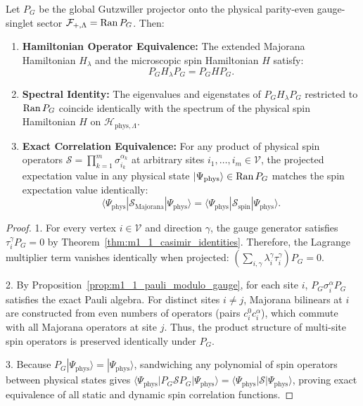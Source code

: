 \begin{theorem}
\label{thm:m1_1_projected_equivalence}
Let $P_G$ be the global Gutzwiller projector onto the physical parity-even gauge-singlet sector $\mathcal{F}_{+, \Lambda} = \operatorname{Ran} P_G$. Then:
\begin{enumerate}
    \item \textbf{Hamiltonian Operator Equivalence:} The extended Majorana Hamiltonian $H_\lambda$ and the microscopic spin Hamiltonian $H$ satisfy:
    \begin{equation}
    \label{eq:m1_1_projected_equivalence}
    P_G H_\lambda P_G = P_G H P_G.
    \end{equation}
    \item \textbf{Spectral Identity:} The eigenvalues and eigenstates of $P_G H_\lambda P_G$ restricted to $\operatorname{Ran} P_G$ coincide identically with the spectrum of the physical spin Hamiltonian $H$ on $\mathcal{H}_{\mathrm{phys}, \Lambda}$.
    \item \textbf{Exact Correlation Equivalence:} For any product of physical spin operators $\mathcal{S} = \prod_{k=1}^m \sigma_{i_k}^{\alpha_k}$ at arbitrary sites $i_1, \dots, i_m \in \mathcal{V}$, the projected expectation value in any physical state $|\Psi_{\mathrm{phys}}\rangle \in \operatorname{Ran} P_G$ matches the spin expectation value identically:
    \begin{equation}
    \label{eq:m1_1_projected_correlations}
    \langle \Psi_{\mathrm{phys}} | \mathcal{S}_{\mathrm{Majorana}} | \Psi_{\mathrm{phys}} \rangle = \langle \Psi_{\mathrm{phys}} | \mathcal{S}_{\mathrm{spin}} | \Psi_{\mathrm{phys}} \rangle.
    \end{equation}
\end{enumerate}
\end{theorem}
\begin{proof}
1. For every vertex $i \in \mathcal{V}$ and direction $\gamma$, the gauge generator satisfies $\tau_i^\gamma P_G = 0$ by Theorem~\ref{thm:m1_1_casimir_identities}. Therefore, the Lagrange multiplier term vanishes identically when projected: $\left(\sum_{i,\gamma}\lambda_i^\gamma \tau_i^\gamma\right) P_G = 0$.

2. By Proposition~\ref{prop:m1_1_pauli_modulo_gauge}, for each site $i$, $P_G \sigma_i^\alpha P_G$ satisfies the exact Pauli algebra. For distinct sites $i \neq j$, Majorana bilinears at $i$ are constructed from even numbers of operators (pairs $c_i^0 c_i^\alpha$), which commute with all Majorana operators at site $j$. Thus, the product structure of multi-site spin operators is preserved identically under $P_G$.

3. Because $P_G |\Psi_{\mathrm{phys}}\rangle = |\Psi_{\mathrm{phys}}\rangle$, sandwiching any polynomial of spin operators between physical states gives $\langle \Psi_{\mathrm{phys}} | P_G \mathcal{S} P_G | \Psi_{\mathrm{phys}} \rangle = \langle \Psi_{\mathrm{phys}} | \mathcal{S} | \Psi_{\mathrm{phys}} \rangle$, proving exact equivalence of all static and dynamic spin correlation functions.
\end{proof}

